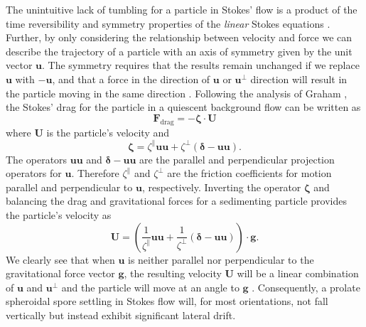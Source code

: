\documentclass{article}
\def\u{\mathbf{u}}
\def\U{\mathbf{U}}
\begin{document}
The unintuitive lack of tumbling for a particle in Stokes' flow is a product of the
time reversibility and symmetry properties of the \textit{linear} Stokes equations
\cite {Graham}. Further, by only considering the relationship between velocity and
force we can describe the trajectory of a particle with an axis of symmetry given by
the unit vector $\u$. The symmetry requires that the results remain unchanged if we
replace $\u$ with $-\u$, and that a force in the direction of $\u$ or $\u^\perp$ 
direction will result in the particle moving in the same direction \cite{k&k}. Following 
the analysis of Graham \cite{Graham}, the Stokes' drag for the particle in a quiescent
background flow can be written as 
\begin{equation}
    \mathbf{F}_{\text{drag}} = - \mathbf{\zeta} \cdot \U
\end{equation}
where $\U$ is the particle's velocity and 
\begin{equation}
    \mathbf{\zeta} = \zeta^\parallel \u\u + \zeta^\perp(\mathbf{\delta - \u \u}).
\end{equation}
The operators $\u\u$ and $\mathbf{\delta} - \u\u$ are the parallel and perpendicular
projection operators for $\u$. Therefore $\zeta^\parallel$ and $\zeta^\perp$ are the 
friction coefficients for motion parallel and perpendicular to $\u$, respectively.
Inverting the operator $\mathbf{\zeta}$ and balancing the drag and gravitational 
forces for a sedimenting particle provides the particle's velocity as 
\begin{equation}
    \U = \left(\frac{1}{\zeta^\parallel}\u\u + \frac{1}{\zeta^\perp}
    (\mathbf{\delta - \u \u})\right) \cdot \mathbf{g}.
\end{equation}
We clearly see that when $\u$ is neither parallel nor perpendicular to the 
gravitational force vector $\mathbf{g}$, the resulting velocity $\U$ will be a linear 
combination of $\u$ and $\u^\perp$ and the particle will move at an angle to 
$\mathbf{g}$ \cite{Graham}. Consequently, a prolate spheroidal spore settling in Stokes flow will, for most orientations, not fall vertically but instead exhibit significant lateral drift.


\newpage


\end{document}
